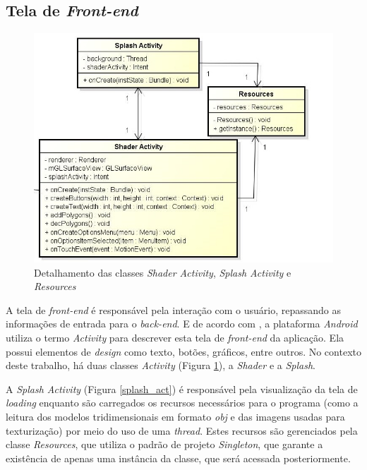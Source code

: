 \subsection{Tela de \textit{Front-end}}

	\begin{figure}[ht]
	\centering
		\includegraphics[keepaspectratio=true,scale=0.5]{figuras/shader_splash.jpg}
	\caption{Detalhamento das classes \textit{Shader Activity}, \textit{Splash Activity} e \textit{Resources}}
	\label{shader_splash}
	\end{figure}

	A tela de \textit{front-end} é responsável pela interação com o usuário, repassando as informações de entrada para o \textit{back-end}. E de acordo com \cite{androidsdkmanager}, a plataforma \textit{Android} utiliza o termo \textit{Activity} para descrever esta tela de \textit{front-end} da aplicação. Ela possui elementos de \textit{design} como texto, botões, gráficos, entre outros. No contexto deste trabalho, há duas classes \textit{Activity} (Figura \ref{shader_splash}), a \textit{Shader} e a \textit{Splash}. 

	A \textit{Splash Activity} (Figura  \ref{splash_act}) é responsável pela visualização da tela de \textit{loading} enquanto são carregados os recursos necessários para o programa (como a leitura dos modelos tridimensionais em formato \textit{obj} e das imagens usadas para texturização) por meio do uso de uma \textit{thread}. Estes recursos são gerenciados pela classe \textit{Resources}, que utiliza o padrão de projeto \textit{Singleton}, que garante a existência de apenas uma instância da classe, que será acessada posteriormente.

